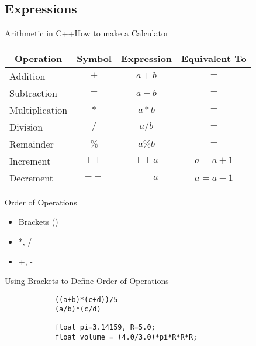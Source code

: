 \subsection{Expressions}

\begin{frame}[fragile]{Arithmetic in C++}{How to make a Calculator}
    \Large
    \begin{center}
        \begin{table}[]
        \centering
        \begin{tabular}{lccc}
        \hline
        \multicolumn{1}{c}{\textbf{Operation}} & \textbf{Symbol} & \textbf{Expression} & \textbf{Equivalent To} \\ \hline
        Addition          & $+ $     & $a + b$    & $-$         \\ \hline
        Subtraction       & $- $     & $a - b$    & $-$         \\ \hline
        Multiplication    & $* $     & $a * b$    & $-$         \\ \hline
        Division          & $/ $     & $a / b$    & $-$         \\ \hline
        Remainder         & $\%$     & $a \% b$   & $-$         \\ \hline
        \pause
        Increment         & $++$     & $++a$      & $a = a+1$    \\ \hline
        Decrement         & $--$     & $--a$      & $a = a-1$    \\ \hline
        \end{tabular}
        \end{table}
    \end{center}
\end{frame}

\begin{frame}[fragile]{Order of Operations}{}
    \large
    \begin{itemize}
        \item Brackets ()
        \item *, /
        \item +, -
    \end{itemize}
    \pause
    \begin{block}{Using Brackets to Define Order of Operations}
        \begin{verbatim}
            ((a+b)*(c+d))/5
            (a/b)*(c/d)
        \end{verbatim}
    \end{block}
    \pause
    \begin{example}
        \begin{verbatim}
            float pi=3.14159, R=5.0;
            float volume = (4.0/3.0)*pi*R*R*R;
        \end{verbatim}
    \end{example}
\end{frame}

